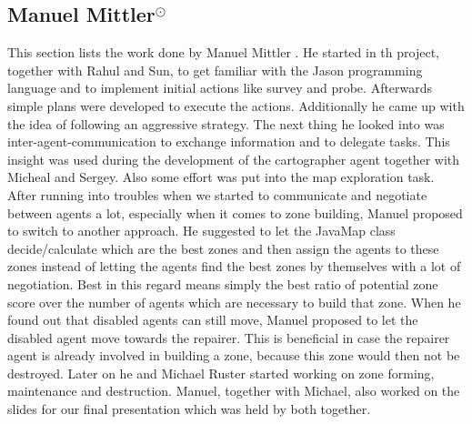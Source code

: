 \subsection[Manuel Mittler]{Manuel Mittler$^{\odot}$}
This section lists the work done by Manuel Mittler .
He started in th project, together with Rahul and Sun, to get familiar with the Jason programming language and to implement initial actions like survey and probe. Afterwards simple plans were developed to execute the actions. Additionally he came up with the idea of following an aggressive strategy. The next thing he looked into was inter-agent-communication to exchange information and to delegate tasks. This insight was used during the development of the cartographer agent together with Micheal and Sergey. Also some effort was put into the map exploration task. After running into troubles when we started to communicate and negotiate between agents a lot, especially when it comes to zone building, Manuel proposed to switch to another approach. He suggested to let the JavaMap class decide/calculate which are the best zones and then assign the agents to these zones instead of letting the agents find the best zones by themselves with a lot of negotiation. Best in this regard means simply the best ratio of potential zone score over the number of agents which are necessary to build that zone. When he found out that disabled agents can still move, Manuel proposed to let the disabled agent move towards the repairer. This is beneficial in case the repairer agent is already involved in building a zone, because this zone would then not be destroyed. Later on he and Michael Ruster started working on zone forming, maintenance and destruction.
Manuel, together with Michael, also worked on the slides for our final presentation which was held by both together.
